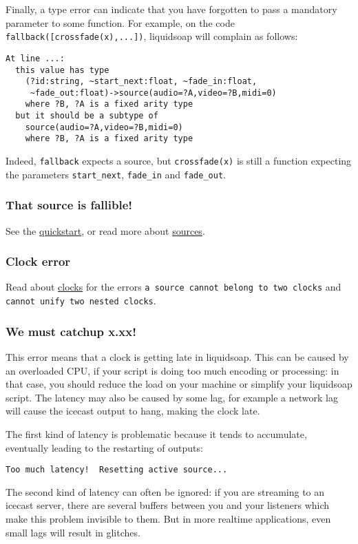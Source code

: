 \documentclass{book}
\begin{document}
Finally, a type error can indicate that you have forgotten to pass a mandatory
parameter to some function. For example, on the code
\verb+fallback([crossfade(x),...])+, liquidsoap will complain as follows:

\begin{verbatim}
At line ...:
  this value has type
    (?id:string, ~start_next:float, ~fade_in:float,
     ~fade_out:float)->source(audio=?A,video=?B,midi=0)
    where ?B, ?A is a fixed arity type
  but it should be a subtype of
    source(audio=?A,video=?B,midi=0)
    where ?B, ?A is a fixed arity type
\end{verbatim}
Indeed, \verb+fallback+ expects a source, but \verb+crossfade(x)+ is still a
function expecting the parameters \verb+start_next+, \verb+fade_in+ and
\verb+fade_out+.

\subsubsection{That source is fallible!}
See the \href{quick_start.html}{quickstart}, or read more about
\href{sources.html}{sources}.

\subsubsection{Clock error}
Read about \href{clocks.html}{clocks} for the errors
\verb+a source cannot belong to two clocks+ and
\verb+cannot unify two nested clocks+.

\subsubsection{We must catchup x.xx!}
This error means that a clock is getting late in liquidsoap. This can be caused
by an overloaded CPU, if your script is doing too much encoding or processing:
in that case, you should reduce the load on your machine or simplify your
liquidsoap script. The latency may also be caused by some lag, for example a
network lag will cause the icecast output to hang, making the clock late.

The first kind of latency is problematic because it tends to accumulate,
eventually leading to the restarting of outputs:
\begin{verbatim}
Too much latency!  Resetting active source...
\end{verbatim}

The second kind of latency can often be ignored: if you are streaming to an
icecast server, there are several buffers between you and your listeners which
make this problem invisible to them. But in more realtime applications, even
small lags will result in glitches.
\end{document}
